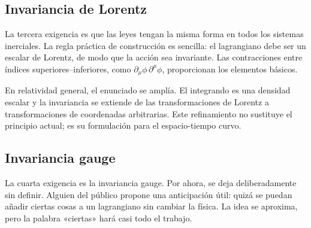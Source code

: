 \subsection{Invariancia de Lorentz}

La tercera exigencia es que las leyes tengan la misma forma en todos los sistemas inerciales. La regla práctica de construcción es sencilla: el lagrangiano debe ser un escalar de Lorentz, de modo que la acción sea invariante. Las contracciones entre índices superiores--inferiores, como \(\partial_\mu\phi\,\partial^\mu\phi\), proporcionan los elementos básicos.

En relatividad general, el enunciado se amplía. El integrando es una densidad escalar y la invariancia se extiende de las transformaciones de Lorentz a transformaciones de coordenadas arbitrarias. Este refinamiento no sustituye el principio actual; es su formulación para el espacio-tiempo curvo.

\begin{classroomqa}
\end{classroomqa}

\begin{classroomqa}
\end{classroomqa}

\subsection{Invariancia gauge}

La cuarta exigencia es la invariancia gauge. Por ahora, se deja deliberadamente sin definir. Alguien del público propone una anticipación útil: quizá se puedan añadir ciertas cosas a un lagrangiano sin cambiar la física. La idea se aproxima, pero la palabra «ciertas» hará casi todo el trabajo.

